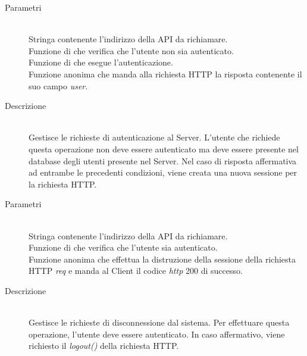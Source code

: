 \begin{description}
\begin{description}
\begin{mldescription}
 \begin{description}
  \item[Parametri]
   \begin{mldescription}
     \hfill \\
    Stringa contenente l'indirizzo della API da richiamare.
     \hfill \\
    Funzione di  che verifica che l'utente non sia autenticato.
     \hfill \\
    Funzione di  che esegue l'autenticazione.
     \hfill \\
    Funzione anonima che manda alla richiesta HTTP la risposta contenente il suo campo \textit{user}.
   \end{mldescription}
  \item[Descrizione] \hfill \\
 Gestisce le richieste di autenticazione al Server. L'utente che richiede questa operazione non deve essere autenticato ma deve essere presente nel database degli utenti presente nel Server. Nel caso di risposta affermativa ad entrambe le precedenti condizioni, viene creata una nuova sessione per la richiesta HTTP.
 \end{description}
 
 \begin{description}
  \item[Parametri]
   \begin{mldescription}
     \hfill \\
    Stringa contenente l'indirizzo della API da richiamare.
     \hfill \\
    Funzione di  che verifica che l'utente sia autenticato.
     \hfill \\
    Funzione anonima che effettua la distruzione della sessione della richiesta HTTP \textit{req} e manda al Client il codice \textit{http} 200 di successo.
   \end{mldescription}
  \item[Descrizione] \hfill \\
 Gestisce le richieste di disconnessione dal sistema. Per effettuare questa operazione, l'utente deve essere autenticato. In caso affermativo, viene richiesto il \textit{logout()} della richiesta HTTP.
 \end{description}
 

\end{mldescription}
\end{description}
\end{description}

